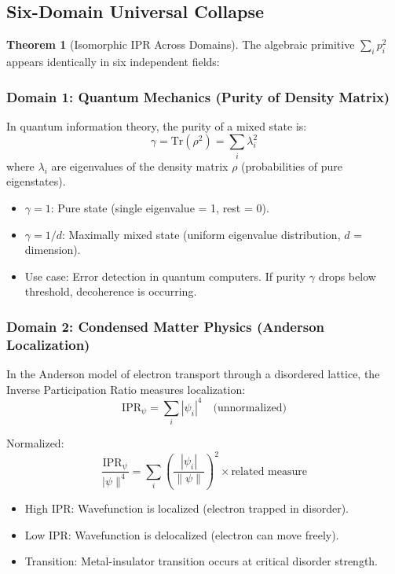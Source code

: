 \documentclass[11pt,oneside]{article}
\theoremstyle{definition}
\newtheorem{theorem}{Theorem}
\begin{document}
\subsection{Six-Domain Universal Collapse}

\begin{theorem}[Isomorphic IPR Across Domains]
The algebraic primitive $\sum_i p_i^2$ appears identically in six independent fields:

\end{theorem}

\subsubsection{Domain 1: Quantum Mechanics (Purity of Density Matrix)}

In quantum information theory, the purity of a mixed state is:
\[
\gamma = \text{Tr}(\rho^2) = \sum_i \lambda_i^2
\]
where $\lambda_i$ are eigenvalues of the density matrix $\rho$ (probabilities of pure eigenstates).

\begin{itemize}
  \item $\gamma = 1$: Pure state (single eigenvalue = 1, rest = 0).
  \item $\gamma = 1/d$: Maximally mixed state (uniform eigenvalue distribution, $d$ = dimension).
  \item Use case: Error detection in quantum computers. If purity $\gamma$ drops below threshold, decoherence is occurring.
\end{itemize}

\subsubsection{Domain 2: Condensed Matter Physics (Anderson Localization)}

In the Anderson model of electron transport through a disordered lattice, the Inverse Participation Ratio measures localization:
\[
\text{IPR}_{\psi} = \sum_i |\psi_i|^4 \quad \text{(unnormalized)}
\]

Normalized:
\[
\frac{\text{IPR}_{\psi}}{|\psi\|^4} = \sum_i \left(\frac{|\psi_i|}{\|\psi\|}\right)^2 \times \text{related measure}
\]

\begin{itemize}
  \item High IPR: Wavefunction is localized (electron trapped in disorder).
  \item Low IPR: Wavefunction is delocalized (electron can move freely).
  \item Transition: Metal-insulator transition occurs at critical disorder strength.
\end{itemize}
\end{document}
